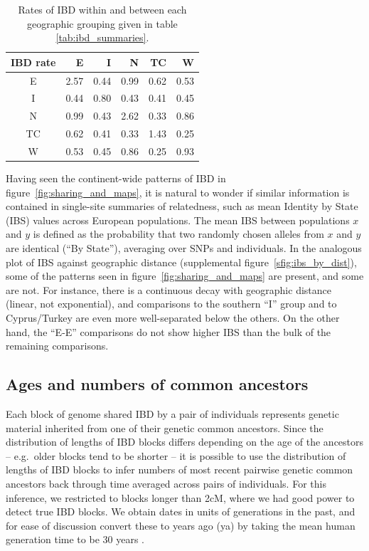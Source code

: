 \documentclass{article}
\begin{document}
\begin{table}[!htp]
\begin{center}
\begin{tabular}{|c|rrrrr|}
  \hline
   IBD rate  & E & I & N & TC & W \\ 
  \hline
  E  & 2.57 & 0.44 & 0.99 & 0.62 & 0.53 \\ 
  I  & 0.44 & 0.80 & 0.43 & 0.41 & 0.45 \\ 
  N  & 0.99 & 0.43 & 2.62 & 0.33 & 0.86 \\ 
  TC & 0.62 & 0.41 & 0.33 & 1.43 & 0.25 \\ 
  W  & 0.53 & 0.45 & 0.86 & 0.25 & 0.93 \\ 
   \hline
\end{tabular}
\end{center}
\caption{
Rates of IBD within and between each geographic grouping given in table \ref{tab:ibd_summaries}.
\label{tab:group_rates}
}
\end{table}



Having seen the continent-wide patterns of IBD in figure~\ref{fig:sharing_and_maps},
it is natural to wonder if similar information is contained in
single-site summaries of relatedness,
such as mean Identity by State (IBS) values across European populations.
The mean IBS between populations $x$ and $y$ is defined as the probability that two randomly chosen alleles from $x$ and $y$
are identical (``By State''),
averaging over SNPs and individuals.
In the analogous plot of IBS against geographic distance (supplemental figure~\ref{sfig:ibs_by_dist}),
some of the patterns seen in figure~\ref{fig:sharing_and_maps} are present, and some are not.
For instance, there is a continuous decay with geographic distance (linear, not exponential),
and comparisons to the southern ``I'' group and to Cyprus/Turkey are even more well-separated below the others.
On the other hand, the ``E-E'' comparisons do not show higher IBS than the bulk of the remaining comparisons.


\subsection{Ages and numbers of common ancestors}

Each block of genome shared IBD by a pair of individuals represents genetic material 
inherited from one of their genetic common ancestors. 
Since the distribution of lengths of IBD blocks differs depending on the age of the ancestors
-- e.g.\ older blocks tend to be shorter --
it is possible to use the distribution of lengths of IBD blocks
to infer numbers of most recent pairwise genetic common ancestors back
through time averaged across pairs of individuals.
For this inference, we restricted to blocks longer than 2cM, where we had good power to detect true IBD blocks.
We obtain dates in units of generations in the past,
and for ease of discussion convert these to years ago (ya)
by taking the mean human generation time to be 30 years \citep{fenner2005crosscultural}. 
\end{document}
